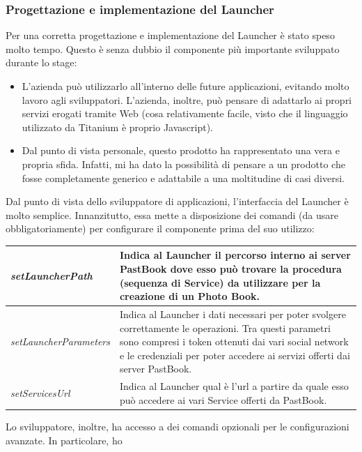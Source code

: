 			\subsubsection{Progettazione e implementazione del Launcher}
				Per una corretta progettazione e implementazione del Launcher è stato speso molto tempo. Questo è senza dubbio il
				componente più importante sviluppato durante lo stage:
				\begin{itemize}
					\item L'azienda può utilizzarlo all'interno delle future applicazioni, evitando molto lavoro agli
					sviluppatori. L'azienda, inoltre, può pensare di adattarlo ai propri servizi erogati tramite Web (cosa
					relativamente facile, visto che il linguaggio utilizzato da Titanium è proprio Javascript).
					\item Dal punto di vista personale, questo prodotto ha rappresentato una vera e propria sfida. Infatti, mi ha
					dato la possibilità di pensare a un prodotto che fosse completamente generico e adattabile a una moltitudine
					di casi diversi.
				\end{itemize}
				Dal punto di vista dello sviluppatore di applicazioni, l'interfaccia del Launcher è molto semplice. Innanzitutto, essa
				mette a disposizione dei comandi (da usare obbligatoriamente) per configurare il componente prima del suo utilizzo:
				\begin{center}
					\begin{tabular}[H]{p{} p{}}
						\emph{setLauncherPath}		& Indica al Launcher il percorso interno ai server PastBook dove
										  esso può trovare la procedura (sequenza di Service) da utilizzare
										  per la creazione di un Photo Book.\\
						\hline
						\emph{setLauncherParameters}	& Indica al Launcher i dati necessari per poter svolgere
										  correttamente le operazioni. Tra questi parametri sono compresi
										  i token ottenuti dai vari social network e le credenziali per
										  poter accedere ai servizi offerti dai server PastBook.\\
						\hline
						\emph{setServicesUrl}		& Indica al Launcher qual è l'url a partire da quale esso può
										  accedere ai vari Service offerti da PastBook.\\
					\end{tabular}
				\end{center}
				Lo sviluppatore, inoltre, ha accesso a dei comandi opzionali per le configurazioni avanzate. In particolare, ho
